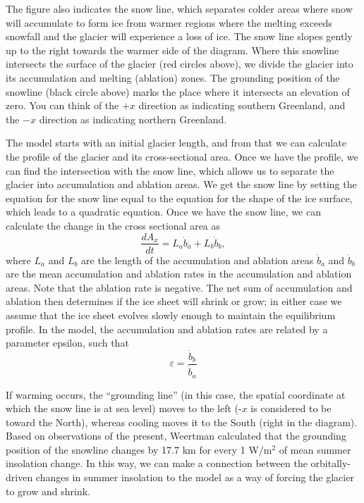 \documentclass[11pt,letterpaper]{article}
\begin{document}
The figure also indicates the snow line, which separates colder areas where snow will accumulate to form ice from warmer regions where the melting exceeds snowfall and the glacier will experience a loss of ice. The snow line slopes gently up to the right towards the warmer side of the diagram. Where this snowline intersects the surface of the glacier (red circles above), we divide the glacier into its accumulation and melting (ablation) zones. The grounding position of the snowline (black circle above) marks the place where it intersects an elevation of zero. You can think of the $+x$ direction as indicating southern Greenland, and the $-x$ direction as indicating northern Greenland.

The model starts with an initial glacier length, and from that we can calculate the profile of the glacier and its cross-sectional area. Once we have the profile, we can find the intersection with the snow line, which allows us to separate the glacier into accumulation and ablation areas. We get the snow line by setting the equation for the snow line equal to the equation for the shape of the ice surface, which leads to a quadratic equation. Once we have the snow line, we can calculate the change in the cross sectional area as
\begin{equation}
\frac{dA_x}{dt}=L_{a}\dot b_{a}+L_{b}\dot b_{b},
\end{equation}
where $L_{a}$ and $L_{b}$ are the length of the accumulation and ablation areas $\dot{b}_{a}$ and $\dot{b}_{b}$ are the mean accumulation and ablation rates in the accumulation and ablation areas. Note that the ablation rate is negative. The net sum of accumulation and ablation then determines if the ice sheet will shrink or grow; in either case we assume that the ice sheet evolves slowly enough to maintain the equilibrium profile. In the model, the accumulation and ablation rates are related by a parameter epsilon, such that
\begin{equation}
\varepsilon=\frac{\dot{b}_{b}}{\dot{b}_{a}}
\end{equation}

If warming occurs, the ``grounding line'' (in this case, the spatial coordinate at which the snow line is at sea level) moves to the left ($‐x$ is considered to be toward the North), whereas cooling moves it to the South (right in the diagram). Based on observations of the present, Weertman calculated that the grounding position of the snowline changes by 17.7 km for every 1 W/m$^2$ of mean summer insolation change. In this way, we can make a connection between the orbitally-driven changes in summer insolation to the model as a way of forcing the glacier to grow and shrink.
\end{document}
